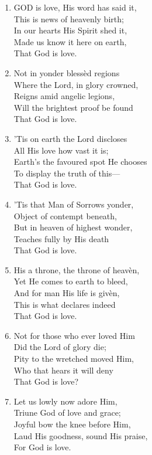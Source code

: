 \documentclass[11pt,a4paper]{article}
\begin{document}
\begin{enumerate}
    \item GOD is love, His word has said it, \\
        This is news of heavenly birth; \\
        In our hearts His Spirit shed it, \\
        Made us know it here on earth, \\
        That God is love.

    \item Not in yonder bless\`ed regions \\
        Where the Lord, in glory crowned, \\
        Reigns amid angelic legions, \\
        Will the brightest proof be found \\
        That God is love.

    \item 'Tis on earth the Lord discloses \\
        All His love how vast it is; \\
        Earth's the favoured spot He chooses \\
        To display the truth of this--- \\
        That God is love.

    \item 'Tis that Man of Sorrows yonder, \\
        Object of contempt beneath, \\
        But in heaven of highest wonder, \\
        Teaches fully by His death \\
        That God is love.

    \item His a throne, the throne of heav\`en, \\
        Yet He comes to earth to bleed, \\
        And for man His life is giv\`en, \\
        This is what declares indeed \\
        That God is love.

    \item Not for those who ever loved Him \\
        Did the Lord of glory die; \\
        Pity to the wretched moved Him, \\
        Who that hears it will deny \\
        That God is love?

    \item Let us lowly now adore Him, \\
        Triune God of love and grace; \\
        Joyful bow the knee before Him, \\
        Laud His goodness, sound His praise, \\
        For God is love.

\end{enumerate}
\end{document}
